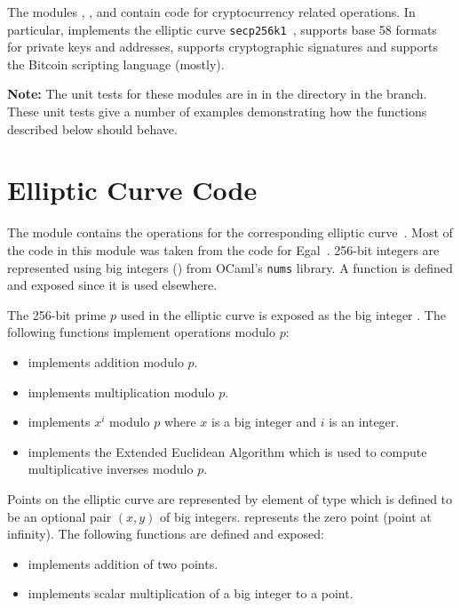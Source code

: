 The modules , ,  and 
contain code for cryptocurrency related operations.
In particular,  implements the elliptic curve {\tt{secp256k1}}~\cite{sec2final},
 supports base 58 formats for private keys and addresses,
 supports cryptographic signatures
and  supports the Bitcoin scripting language (mostly).

{\bf{Note:}} The unit tests for these modules are in {}
in the {}
directory in the {} branch.
These unit tests give a number of examples demonstrating how the functions described below should behave.

\section{Elliptic Curve Code}

The module  contains the operations for the corresponding elliptic curve~\cite{sec2final}.
Most of the code in this module was taken from the code for Egal~\cite{Brown2014}.
256-bit integers are represented using big integers () from OCaml's {\tt{nums}} library.
A function {} is defined and exposed since it is used elsewhere.

The 256-bit prime $p$ used in the elliptic curve is
exposed as the big integer {}.
The following functions implement operations modulo $p$:
\begin{itemize}
\item {} implements addition modulo $p$.
\item {} implements multiplication modulo $p$.
\item {} implements $x^i$ modulo $p$ where $x$ is a big integer and $i$ is an integer.
\item {} implements the Extended Euclidean Algorithm which is used to compute
multiplicative inverses modulo $p$.
\end{itemize}

Points on the elliptic curve are represented by element of type {}
which is defined to be an optional pair $(x,y)$ of big integers.
{} represents the zero point (point at infinity).
The following functions are defined and exposed:
\begin{itemize}
\item {} implements addition of two points.
\item {} implements scalar multiplication of a big integer to a point.
\end{itemize}

